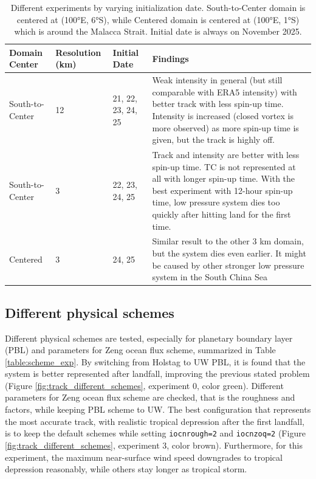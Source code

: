 \documentclass[journal abbreviation, manuscript]{copernicus}
\begin{document}
\begin{table}[h] 
\centering
\caption{Different experiments by varying initialization date. South-to-Center domain is centered at (100°E, 6°S), while Centered domain is centered at (100°E, 1°S) which is around the Malacca Strait. Initial date is always on November 2025.}
\begin{tabular}{p{3cm} p{2.5cm} p{2cm} p{7cm}}
\hline
\textbf{Domain Center} & \textbf{Resolution (km)} & \textbf{Initial Date} & \textbf{Findings} \\
\hline
South-to-Center & 12  & 21, 22, 23, 24, 25 & Weak intensity in general (but still comparable with ERA5 intensity) with better track with less spin-up time. Intensity is increased (closed vortex is more observed) as more spin-up time is given, but the track is highly off. \\
South-to-Center & 3 & 22, 23, 24, 25 & Track and intensity are better with less spin-up time. TC is not represented at all with longer spin-up time. With the best experiment with 12-hour spin-up time, low pressure system dies too quickly after hitting land for the first time. \\
Centered & 3 & 24, 25 & Similar result to the other 3 km domain, but the system dies even earlier. It might be caused by other stronger low pressure system in the South China Sea\\
\hline
\end{tabular}
\label{table:diff_init}
\end{table}

\subsection*{Different physical schemes}

Different physical schemes are tested, especially for planetary boundary layer (PBL) and parameters for Zeng ocean flux scheme, summarized in Table \ref{table:scheme_exp}. By switching from Holstag to UW PBL, it is found that the system is better represented after landfall, improving the previous stated problem (Figure \ref{fig:track_different_schemes}, experiment 0, color green). Different parameters for Zeng ocean flux scheme are checked, that is the roughness and factors, while keeping PBL scheme to UW. The best configuration that represents the most accurate track, with realistic tropical depression after the first landfall, is to keep the default schemes while setting \texttt{iocnrough=2} and \texttt{iocnzoq=2} (Figure \ref{fig:track_different_schemes}, experiment 3, color brown). Furthermore, for this experiment, the maximum near-surface wind speed downgrades to tropical depression reasonably, while others stay longer as tropical storm.
\end{document}
